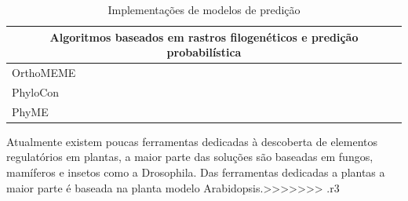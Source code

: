 \begin{table}[h!]
\begin{center}
\begin{tabular}{| l | c | }
    \multicolumn{2}{|c|}{Algoritmos baseados em rastros filogenéticos e predição probabilística}             \\ \hline

    OrthoMEME      & \cite{Carmack2007}  \\ \hline
    PhyloCon       & \cite{Wang2003}     \\ \hline
    PhyME          & \cite{Sinha2004}    \\ \hline

    \hline

  \end{tabular}
\end{center}
  \caption{Implementações de modelos de predição}
\end{table}


Atualmente existem poucas ferramentas dedicadas à descoberta de elementos regulatórios em plantas, a maior parte das soluções são baseadas em fungos, mamíferos e insetos como a Drosophila. Das ferramentas dedicadas a plantas a maior parte é baseada na planta modelo Arabidopsis.>>>>>>> .r3
